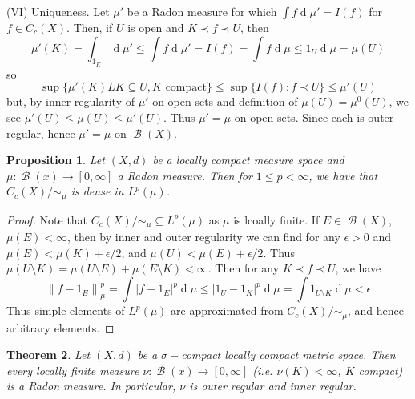 \documentclass[12pt, a4paper]{memoir}
\newcommand{\norm}[1]{\ensuremath{\left\lVert#1\right\rVert}} %
\newtheorem{theorem}{Theorem}[section]
\newtheorem{proposition}[theorem]{Proposition}
\theoremstyle{nonumberplain}
\newtheorem{proof}{Proof}
\DeclareMathOperator{\B}{\mathcal{B}}
\renewcommand{\d}[1]{\ensuremath{\operatorname{d}\!{#1}}} %
\begin{document}
(VI) Uniqueness.
Let $\mu'$ be a Radon measure for which $\int f\d{\mu'}=I(f)$ for $f\in C_c(X)$.
Then, if $U$ is open and $K\prec f\prec U$, then
\begin{equation*}
    \mu'(K)=\int_{1_K}\d{\mu'}\leq\int f\d{\mu'}=I(f)=\int f\d{\mu}\leq 1_U\d{\mu}=\mu(U)
\end{equation*}
so
\begin{equation*}
    \sup\{\mu'(K)LK\subseteq U,K\text{ compact}\}\leq\sup\{I(f):f\prec U\}\leq\mu'(U)
\end{equation*}
but, by inner regularity of $\mu'$ on open sets and definition of $\mu(U)=\mu^0(U)$, we see $\mu'(U)\leq \mu(U)\leq\mu'(U)$.
Thus $\mu'=\mu$ on open sets.
Since each is outer regular, hence $\mu'=\mu$ on $\B(X)$.
\begin{proposition}
    Let $(X,d)$ be a locally compact measure space and $\mu:\B(x)\to[0,\infty]$ a Radon measure.
    Then for $1\leq p<\infty$, we have that $C_c(X)/{\sim_\mu}$ is dense in $L^p(\mu)$.
\end{proposition}
\begin{proof}
    Note that $C_c(X)/{\sim_\mu}\subseteq L^p(\mu)$ as $\mu$ is lcoally finite.
    If $E\in\B(X)$, $\mu(E)<\infty$, then by inner and outer regularity we can find for any $\epsilon>0$ and $\mu(E)<\mu(K)+\epsilon/2$, and $\mu(U)<\mu(E)+\epsilon/2$.
    Thus $\mu(U\setminus K)=\mu(U\setminus E)+\mu(E\setminus K)<\infty$.
    Then for any $K\prec f\prec U$, we have
    \begin{equation*}
        \norm{f-1_E}_\mu^p=\int|f-1_E|^p\d{\mu}\leq|1_U-1_K|^p\d{\mu}=\int1_{U\setminus K}\d{\mu}<\epsilon
    \end{equation*}
    Thus simple elements of $L^p(\mu)$ are approximated from $C_c(X)/{\sim_\mu}$, and hence arbitrary elements.
\end{proof}
\begin{theorem}
    Let $(X,d)$ be a $\sigma-$compact locally compact metric space.
    Then every locally finite measure $\nu:\B(x)\to[0,\infty]$ (i.e. $\nu(K)<\infty$, $K$ compact) is a Radon measure.
    In particular, $\nu$ is outer regular and inner regular.
\end{theorem}
\end{document}
